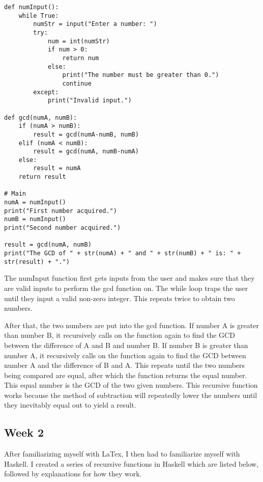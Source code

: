 \documentclass{article}
\theoremstyle{theorem}
\theoremstyle{definition}
\theoremstyle{remark}
\begin{document}
\begin{lstlisting}
def numInput():
    while True:
        numStr = input("Enter a number: ")
        try:
            num = int(numStr)
            if num > 0:
                return num
            else:
                print("The number must be greater than 0.")
                continue
        except:
            print("Invalid input.")

def gcd(numA, numB):
    if (numA > numB):
        result = gcd(numA-numB, numB)
    elif (numA < numB):
        result = gcd(numA, numB-numA)
    else:
        result = numA
    return result

# Main
numA = numInput()
print("First number acquired.")
numB = numInput()
print("Second number acquired.")

result = gcd(numA, numB)
print("The GCD of " + str(numA) + " and " + str(numB) + " is: " + str(result) + ".")
\end{lstlisting}
%
The numInput function first gets inputs from the user and makes sure that they are valid inputs to perform the gcd function on. The while loop traps the user until they input a valid non-zero integer. This repeats twice to obtain two numbers.

\medskip\noindent
After that, the two numbers are put into the gcd function. If number A is greater than number B, it recursively calls on the function again to find the GCD between the difference of A and B and number B. If number B is greater than number A, it recursively calls on the function again to find the GCD between number A and the difference of B and A. This repeats until the two numbers being compared are equal, after which the function returns the equal number. This equal number is the GCD of the two given numbers. This recursive function works because the method of subtraction will repeatedly lower the numbers until they inevitably equal out to yield a result.

\subsection{Week 2}

After familiarizing myself with LaTex, I then had to familiarize myself with Haskell. I created a series of recursive functions in Haskell which are listed below, followed by explanations for how they work.
\end{document}
